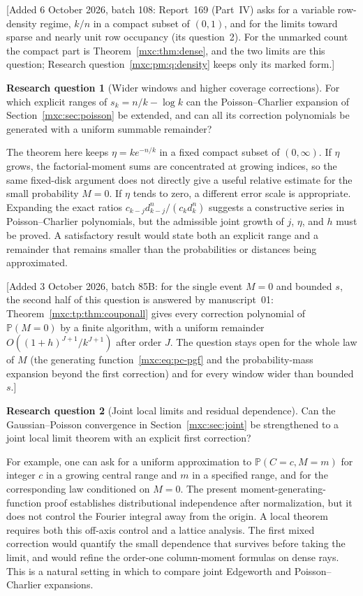 \documentclass[11pt]{article}
\numberwithin{equation}{section}
\theoremstyle{definition}
\newtheorem{question}{Research question}
\theoremstyle{remark}
\newcommand{\Pp}{\mathbb P}
\begin{document}
[Added 6 October 2026, batch 108: Report~169 (Part~IV) asks for a variable
row-density regime, $k/n$ in a compact subset of $(0,1)$, and for the limits
toward sparse and nearly unit row occupancy (its question~2). For the unmarked
count the compact part is Theorem~\ref{mxc:thm:dense}, and the two limits are
this question; Research question~\ref{mxc:pm:q:density} keeps only its marked
form.]

\begin{question}[Wider windows and higher coverage corrections]
For which explicit ranges of $s_k=n/k-\log k$ can the Poisson--Charlier
expansion of Section~\ref{mxc:sec:poisson} be extended, and can all its
correction polynomials be generated with a uniform summable remainder?
\end{question}

The theorem here keeps $\eta=k e^{-n/k}$ in a fixed compact subset of
$(0,\infty)$. If $\eta$ grows, the factorial-moment sums are concentrated
at growing indices, so the same fixed-disk argument does not directly
give a useful relative estimate for the small probability $M=0$.
If $\eta$ tends to zero, a different error scale is appropriate.
Expanding the exact ratios $c_{k-j}d_{k-j}^n/(c_kd_k^n)$ suggests a
constructive series in Poisson--Charlier polynomials, but the admissible
joint growth of $j$, $\eta$, and $h$ must be proved. A satisfactory result
would state both an explicit range and a remainder that remains smaller
than the probabilities or distances being approximated.

[Added 3 October 2026, batch 85B: for the single event $M=0$ and bounded
$s$, the second half of this question is answered by manuscript~01:
Theorem~\ref{mxc:tp:thm:couponall} gives every correction polynomial of
$\Pp(M=0)$ by a finite algorithm, with a uniform remainder
$O((1+h)^{J+1}/k^{J+1})$ after order $J$. The question stays open for
the whole law of $M$ (the generating function~\eqref{mxc:eq:pc-pgf} and
the probability-mass expansion beyond the first correction) and for
every window wider than bounded $s$.]

\begin{question}[Joint local limits and residual dependence]
Can the Gaussian--Poisson convergence in Section~\ref{mxc:sec:joint} be
strengthened to a joint local limit theorem with an explicit first
correction?
\end{question}

For example, one can ask for a uniform approximation to
$\Pp(C=c,M=m)$ for integer $c$ in a growing central range and $m$ in a
specified range, and for the corresponding law conditioned on $M=0$.
The present moment-generating-function proof establishes distributional
independence after normalization, but it does not control the Fourier
integral away from the origin. A local theorem requires both this
off-axis control and a lattice analysis. The first mixed correction
would quantify the small dependence that survives before taking the
limit, and would refine the order-one column-moment formulas on dense
rays. This is a natural setting in which to compare joint Edgeworth
and Poisson--Charlier expansions.
\end{document}
